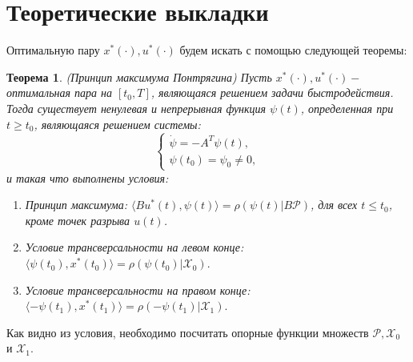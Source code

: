 \documentclass[11pt]{article}
\begin{document}
	
	\newpage
	
	{\vspace*{-2cm} \hspace*{-1cm}\section{Теоретические выкладки}}
	{\hspace{-0.6cm} Оптимальную пару $x^{*}(\cdot), u^{*}(\cdot)$ будем искать с помощью следующей теоремы:}

	\newtheorem{theorem}{Теорема}
	\begin{theorem}
		{(Принцип максимума Понтрягина) }
		\newline
		{Пусть $x^{*}(\cdot),u^{*}(\cdot) - $ оптимальная пара на $[t_{0}, T]$, являющаяся решением задачи быстродействия. Тогда существует ненулевая и непрерывная функция $\psi (t)$, определенная при $t \geq t_{0}$, являющаяся решением системы: }
		\[ \begin{cases}
		\dot{\psi} = -A^{T}\psi (t), \\
		\psi (t_{0}) = \psi_{0} \neq 0,	
		\end{cases} \]
		\newline
		{\hspace{-0.6cm}и такая что выполнены условия:}
		\begin{enumerate}
			\item {Принцип максимума: $\langle Bu^{*}(t),\psi(t) \rangle = \rho(\psi(t) | B\mathcal{P})$, для всех $t \leq t_{0}$, кроме точек разрыва $u(t)$.}
			\item 	{ Условие трансверсальности на левом конце: $\langle \psi(t_{0}), x^{*}(t_{0}) \rangle = \rho(\psi(t_{0})|\mathcal{X}_{0}).$  }
			\item { Условие трансверсальности на правом конце: $\langle -\psi(t_{1}), x^{*}(t_1) \rangle = \rho (-\psi(t_{1})|\mathcal{X}_{1}).$}
		\end{enumerate}
		
		
		
		
	\end{theorem}			
	{\hspace{-0.6cm} Как видно из условия, необходимо посчитать опорные функции множеств $\mathcal{P}, \mathcal{X}_{0}$ и $\mathcal{X}_{1}.$}
	\newline
	
\end{document}
